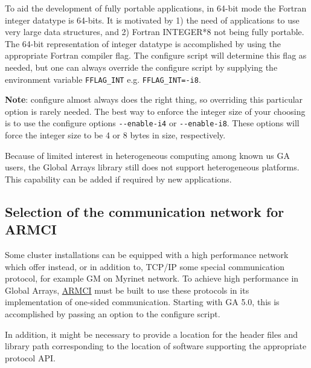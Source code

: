 To aid the development of fully portable applications, in 64-bit mode the
Fortran integer datatype is 64-bits. It is motivated by 1) the need of
applications to use very large data structures, and 2) Fortran INTEGER{*}8 not
being fully portable. The 64-bit representation of integer datatype is
accomplished by using the appropriate Fortran compiler flag. The configure
script will determine this flag as needed, but one can always override the
configure script by supplying the environment variable \texttt{FFLAG\_INT} e.g.
\texttt{FFLAG\_INT=-i8}. 

\textbf{Note}: configure almost always does the right thing, so overriding this
particular option is rarely needed. The best way to enforce the integer size of
your choosing is to use the configure options \texttt{-{}-enable-i4} or
\texttt{-{}-enable-i8}. These options will force the integer size to be 4 or 8
bytes in size, respectively. 

Because of limited interest in heterogeneous computing among known us GA users,
the Global Arrays library still does not support heterogeneous platforms. This
capability can be added if required by new applications. 

\subsection{Selection of the communication network for ARMCI}

Some cluster installations can be equipped with a high performance network
which offer instead, or in addition to, TCP/IP some special communication
protocol, for example GM on Myrinet network. To achieve high performance in
Global Arrays, \href{https://hpc.pnl.gov/armci/}{ARMCI} must be
built to use these protocols in its implementation of one-sided communication.
Starting with GA 5.0, this is accomplished by passing an option to the
configure script. 

In addition, it might be necessary to provide a location for the header files
and library path corresponding to the location of software supporting the
appropriate protocol API. 

